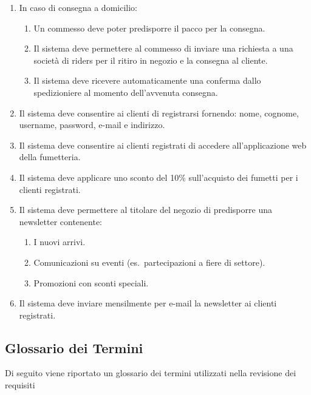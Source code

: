 \documentclass[12pt, a4paper]{article}
\begin{document}
\begin{enumerate}
\item In caso di consegna a domicilio:
  \begin{enumerate}
    \item Un commesso deve poter predisporre il pacco per la consegna.
    \item Il sistema deve permettere al commesso di inviare una richiesta a una società di riders per il ritiro in negozio e la consegna al cliente.
    \item Il sistema deve ricevere automaticamente una conferma dallo spedizioniere al momento dell’avvenuta consegna.
  \end{enumerate}

\item Il sistema deve consentire ai clienti di registrarsi fornendo: nome, cognome, username, password, e-mail e indirizzo.

\item Il sistema deve consentire ai clienti registrati di accedere all’applicazione web della fumetteria.

\item Il sistema deve applicare uno sconto del 10\% sull’acquisto dei fumetti per i clienti registrati.

\item Il sistema deve permettere al titolare del negozio di predisporre una newsletter contenente:
  \begin{enumerate}
    \item I nuovi arrivi.
    \item Comunicazioni su eventi (es.\ partecipazioni a fiere di settore).
    \item Promozioni con sconti speciali.
  \end{enumerate}

\item Il sistema deve inviare mensilmente per e-mail la newsletter ai clienti registrati.
\end{enumerate}

\newpage

\subsection{Glossario dei Termini}

Di seguito viene riportato un glossario dei termini utilizzati nella revisione dei requisiti
\end{document}
